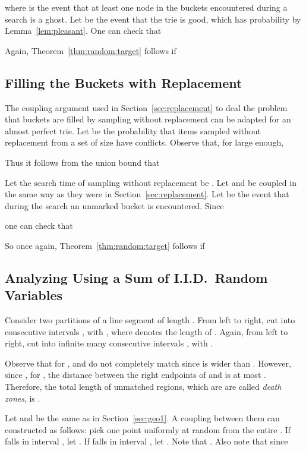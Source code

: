 \documentclass{article}
\begin{document}
where  is the event that at least one node in the buckets
encountered during a search is a ghost. Let  be the event that the
trie is good, which has probability  by Lemma~\ref{lem:pleasant}.
One can check that

Again, Theorem~\ref{thm:random:target} follows if


\subsection{Filling the Buckets with Replacement}

The coupling argument used in Section~\ref{sec:replacement} to deal the problem
that buckets are filled by sampling without replacement can be adapted for an
almost perfect trie.  Let  be the probability that  items sampled
without replacement from a set of size  have
conflicts. Observe that, for  large enough,

Thus it follows from the union bound that



Let the search time of sampling without replacement be .  Let  and
 be coupled in the same way as they were in Section~\ref{sec:replacement}.
Let  be the event that during the search an unmarked bucket is encountered.
Since

one can check that

So once again, Theorem~\ref{thm:random:target} follows if


\subsection{Analyzing  Using a Sum of I.I.D.\ Random Variables}

Consider two partitions of a line segment  of length .  From left to
right, cut  into  consecutive intervals , with
, where  denotes the length of .  Again, from left to right,
cut  into infinite many consecutive intervals , with
. 

Observe that for ,  and  do not completely match since
 is wider than .  However, since , for , the distance between the right endpoints of  and  is at most
. Therefore, the total length of unmatched regions, which are are
called \emph{death zones}, is .

Let  and  be the same as in
Section~\ref{sec:geo1}.  A coupling between them can constructed as follows: pick
one point  uniformly at random from the entire . If  falls in
interval , let . If  falls in interval , let
.  Note that .  Also note that since
\end{document}
